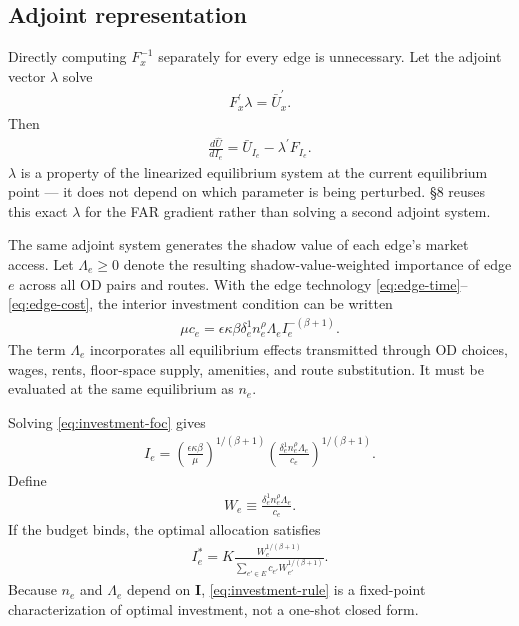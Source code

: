 \documentclass[12pt,a4paper]{article}
\newcommand{\1}{\mathbb 1}
\begin{document}
\subsection{Adjoint representation}

Directly computing $F_x^{-1}$ separately for every edge is unnecessary. Let the adjoint vector $\lambda$ solve
\begin{align}
F_x^{\prime}\lambda
=
\bar U_x^{\prime}.
\label{eq:adjoint-system}
\end{align}
Then
\begin{align}
\frac{d\widehat U}{dI_e}
=
\bar U_{I_e}-\lambda^{\prime}F_{I_e}.
\label{eq:adjoint-gradient}
\end{align}
$\lambda$ is a property of the linearized equilibrium system at the current equilibrium point — it does not depend on which parameter is being perturbed. \S8 reuses this exact $\lambda$ for the FAR gradient rather than solving a second adjoint system.

The same adjoint system generates the shadow value of each edge's market access. Let $\Lambda_e\geq0$ denote the resulting shadow-value-weighted importance of edge $e$ across all OD pairs and routes. With the edge technology \eqref{eq:edge-time}--\eqref{eq:edge-cost}, the interior investment condition can be written
\begin{align}
\mu c_e
=
\epsilon\kappa\beta
\delta_e^1n_e^{\rho}\Lambda_e
I_e^{-(\beta+1)}.
\label{eq:investment-foc}
\end{align}
The term $\Lambda_e$ incorporates all equilibrium effects transmitted through OD choices, wages, rents, floor-space supply, amenities, and route substitution. It must be evaluated at the same equilibrium as $n_e$.

Solving \eqref{eq:investment-foc} gives
\begin{align}
I_e
=
\left(
\frac{\epsilon\kappa\beta}{\mu}
\right)^{1/(\beta+1)}
\left(
\frac{\delta_e^1n_e^{\rho}\Lambda_e}{c_e}
\right)^{1/(\beta+1)}.
\label{eq:investment-level}
\end{align}
Define
\begin{align}
W_e
\equiv
\frac{\delta_e^1n_e^{\rho}\Lambda_e}{c_e}.
\label{eq:edge-weight}
\end{align}
If the budget binds, the optimal allocation satisfies
\begin{align}
\boxed{
I_e^*
=
K
\frac{W_e^{1/(\beta+1)}}
{\displaystyle\sum_{e'\in E}c_{e'}W_{e'}^{1/(\beta+1)}}.
}
\label{eq:investment-rule}
\end{align}
Because $n_e$ and $\Lambda_e$ depend on $\mathbf I$, \eqref{eq:investment-rule} is a fixed-point characterization of optimal investment, not a one-shot closed form.
\end{document}
